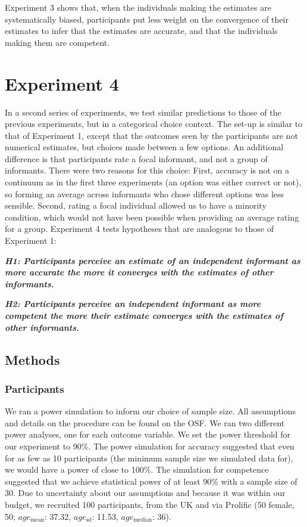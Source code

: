 \documentclass[
  doc,floatsintext]{apa6}
\begin{document}
Experiment 3 shows that, when the individuals making the estimates are systematically biased, participants put less weight on the convergence of their estimates to infer that the estimates are accurate, and that the individuals making them are competent.

\section{Experiment 4}\label{experiment-4}

In a second series of experiments, we test similar predictions to those of the previous experiments, but in a categorical choice context. The set-up is similar to that of Experiment 1, except that the outcomes seen by the participants are not numerical estimates, but choices made between a few options. An additional difference is that participants rate a focal informant, and not a group of informants. There were two reasons for this choice: First, accuracy is not on a continuum as in the first three experiments (an option was either correct or not), so forming an average across informants who chose different options was less sensible. Second, rating a focal individual allowed us to have a minority condition, which would not have been possible when providing an average rating for a group. Experiment 4 tests hypotheses that are analogous to those of Experiment 1:

\textbf{\emph{H1: Participants perceive an estimate of an independent informant as more accurate the more it converges with the estimates of other informants.}}

\textbf{\emph{H2: Participants perceive an independent informant as more competent the more their estimate converges with the estimates of other informants.}}

\subsection{Methods}\label{methods-3}

\subsubsection{Participants}\label{participants-3}

We ran a power simulation to inform our choice of sample size. All assumptions and details on the procedure can be found on the OSF. We ran two different power analyses, one for each outcome variable. We set the power threshold for our experiment to 90\%. The power simulation for accuracy suggested that even for as few as 10 participants (the minimum sample size we simulated data for), we would have a power of close to 100\%. The simulation for competence suggested that we achieve statistical power of at least 90\% with a sample size of 30. Due to uncertainty about our assumptions and because it was within our budget, we recruited 100 participants, from the UK and via Prolific (50 female, 50; \(age_\text{mean}\): 37.32, \(age_\text{sd}\): 11.53, \(age_\text{median}\): 36).
\end{document}

